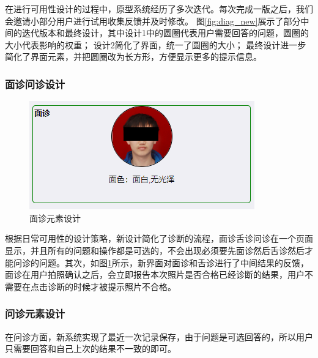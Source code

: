 在进行可用性设计的过程中，原型系统经历了多次迭代。每次完成一版之后，我们会邀请小部分用户进行试用收集反馈并及时修改。
图\ref{fig:diag_new}展示了部分中间的迭代版本和最终设计，其中设计1中的圆圈代表用户需要回答的问题，圆圈的大小代表影响的权重；
设计2简化了界面，统一了圆圈的大小；
最终设计进一步简化了界面元素，并把圆圈改为长方形，方便显示更多的提示信息。

\subsubsection{面诊问诊设计}

\begin{figure}[h]
    \centering
    \includegraphics[]{images/diag_design.png}
    \caption{面诊元素设计}
    \label{fig:diag_design}
\end{figure}

根据日常可用性的设计策略，新设计简化了诊断的流程，面诊舌诊问诊在一个页面显示，并且所有的问题和操作都是可选的，不会出现必须要先面诊然后舌诊然后才能问诊的问题。其次，如图\ref{fig:diag_design}所示，新界面对面诊和舌诊进行了中间结果的反馈，面诊在用户拍照确认之后，会立即报告本次照片是否合格已经诊断的结果，用户不需要在点击诊断的时候才被提示照片不合格。

\subsubsection{问诊元素设计}
在问诊方面，新系统实现了最近一次记录保存，由于问题是可选回答的，所以用户只需要回答和自己上次的结果不一致的即可。

